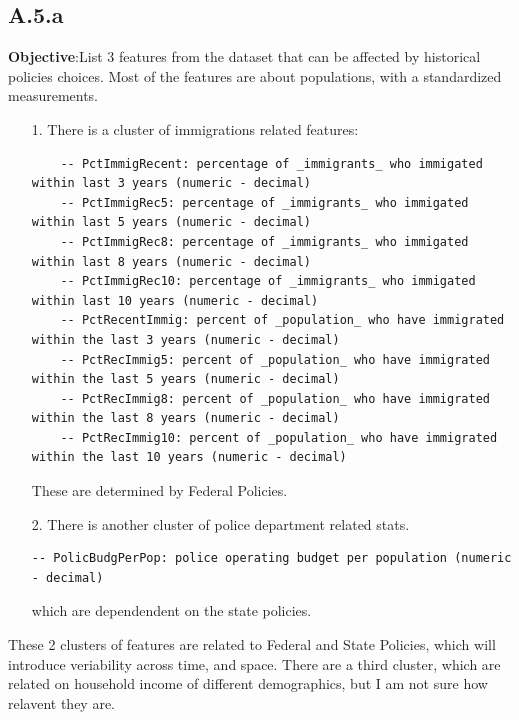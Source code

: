 \documentclass[]{article}
\begin{document}
    \subsection*{A.5.a}
        \textbf{Objective}:List 3 features from the dataset that can be affected by historical policies choices. Most of the features are about populations, with a standardized measurements. 
        \\
        \begin{enumerate}
            \item[1.] There is a cluster of immigrations related features: 
                \begin{lstlisting}
    -- PctImmigRecent: percentage of _immigrants_ who immigated within last 3 years (numeric - decimal)
    -- PctImmigRec5: percentage of _immigrants_ who immigated within last 5 years (numeric - decimal)
    -- PctImmigRec8: percentage of _immigrants_ who immigated within last 8 years (numeric - decimal)
    -- PctImmigRec10: percentage of _immigrants_ who immigated within last 10 years (numeric - decimal)
    -- PctRecentImmig: percent of _population_ who have immigrated within the last 3 years (numeric - decimal)
    -- PctRecImmig5: percent of _population_ who have immigrated within the last 5 years (numeric - decimal)
    -- PctRecImmig8: percent of _population_ who have immigrated within the last 8 years (numeric - decimal)
    -- PctRecImmig10: percent of _population_ who have immigrated within the last 10 years (numeric - decimal)
                \end{lstlisting}
                These are determined by Federal Policies. 
            \item[2.] There is another cluster of police department related stats. 
            \begin{lstlisting}
-- PolicBudgPerPop: police operating budget per population (numeric - decimal)
            \end{lstlisting}
            which are dependendent on the state policies. 
        \end{enumerate}
        These 2 clusters of features are related to Federal and State Policies, which will introduce veriability across time, and space. There are a third cluster, which are related on household income of different demographics, but I am not sure how relavent they are. 
\end{document}
